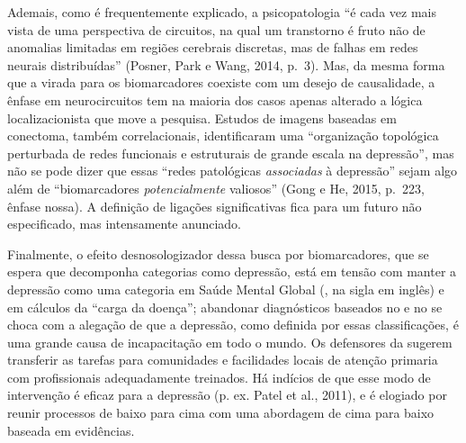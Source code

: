 Ademais, como é frequentemente explicado, a psicopatologia ``é cada vez
mais vista de uma perspectiva de circuitos, na qual um transtorno é
fruto não de anomalias limitadas em regiões cerebrais discretas, mas de
falhas em redes neurais distribuídas'' (Posner, Park e Wang, 2014, p.~3).
Mas, da mesma forma que a virada para os biomarcadores coexiste com um
desejo de causalidade, a ênfase em neurocircuitos tem na maioria dos
casos apenas alterado a lógica localizacionista que move a pesquisa.
Estudos de imagens baseadas em conectoma, também correlacionais,
identificaram uma ``organização topológica perturbada de redes
funcionais e estruturais de grande escala na depressão'', mas não se
pode dizer que essas ``redes patológicas \emph{associadas} à depressão''
sejam algo além de ``biomarcadores \emph{potencialmente} valiosos''
(Gong e He, 2015, p.~223, ênfase nossa). A definição de ligações
significativas fica para um futuro não especificado, mas intensamente
anunciado.

Finalmente, o efeito desnosologizador dessa busca por biomarcadores, que
se espera que decomponha categorias como depressão, está em tensão com
manter a depressão como uma categoria em Saúde Mental Global (, na
sigla em inglês) e em cálculos da ``carga da doença''; abandonar
diagnósticos baseados no \emph{} e no \emph{} se choca com a
alegação de que a depressão, como definida por essas classificações, é
uma grande causa de incapacitação em todo o mundo. Os defensores da 
sugerem transferir as tarefas para comunidades e facilidades locais de
atenção primaria com profissionais adequadamente treinados. Há indícios
de que esse modo de intervenção é eficaz para a depressão (p. ex. Patel et
al., 2011), e é elogiado por reunir processos de baixo para cima com uma
abordagem de cima para baixo baseada em evidências.

